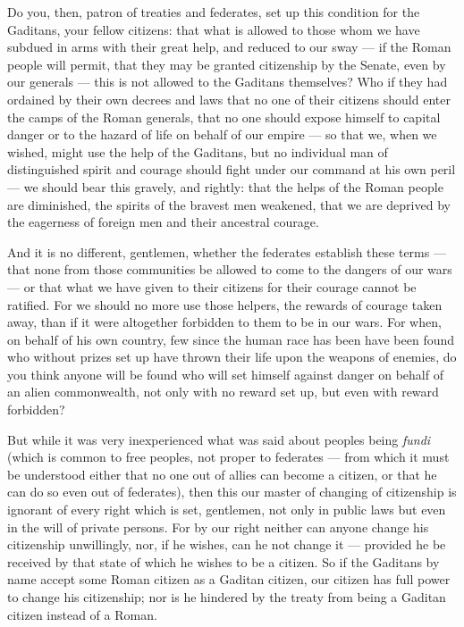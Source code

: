  Do you, then, patron of treaties and federates, set up this condition for the Gaditans, your fellow citizens: that what is allowed to those whom we have subdued in arms with their great help, and reduced to our sway --- if the Roman people will permit, that they may be granted citizenship by the Senate, even by our generals --- this is not allowed to the Gaditans themselves? Who if they had ordained by their own decrees and laws that no one of their citizens should enter the camps of the Roman generals, that no one should expose himself to capital danger or to the hazard of life on behalf of our empire --- so that we, when we wished, might use the help of the Gaditans, but no individual man of distinguished spirit and courage should fight under our command at his own peril --- we should bear this gravely, and rightly: that the helps of the Roman people are diminished, the spirits of the bravest men weakened, that we are deprived by the eagerness of foreign men and their ancestral courage.

 And it is no different, gentlemen, whether the federates establish these terms --- that none from those communities be allowed to come to the dangers of our wars --- or that what we have given to their citizens for their courage cannot be ratified. For we should no more use those helpers, the rewards of courage taken away, than if it were altogether forbidden to them to be in our wars. For when, on behalf of his own country, few since the human race has been have been found who without prizes set up have thrown their life upon the weapons of enemies, do you think anyone will be found who will set himself against danger on behalf of an alien commonwealth, not only with no reward set up, but even with reward forbidden?

 But while it was very inexperienced what was said about peoples being \textit{fundi} (which is common to free peoples, not proper to federates --- from which it must be understood either that no one out of allies can become a citizen, or that he can do so even out of federates), then this our master of changing of citizenship is ignorant of every right which is set, gentlemen, not only in public laws but even in the will of private persons. For by our right neither can anyone change his citizenship unwillingly, nor, if he wishes, can he not change it --- provided he be received by that state of which he wishes to be a citizen. So if the Gaditans by name accept some Roman citizen as a Gaditan citizen, our citizen has full power to change his citizenship; nor is he hindered by the treaty from being a Gaditan citizen instead of a Roman.

